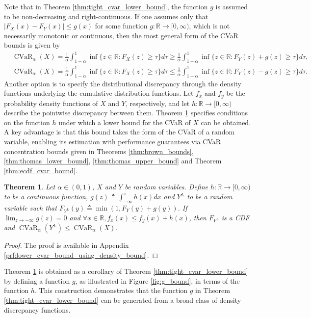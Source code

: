 \documentclass[acmlarge, manuscript, screen, review, natbib=false, oneside]{acmart}
\newtheorem{theorem}{Theorem}[section]
\DeclareMathOperator{\CVaR}{CVaR}
\begin{document}
Note that in Theorem \ref{thm:tight_cvar_lower_bound}, the function $g$ is assumed to be non-decreasing and right-continuous. If one assumes only that $|F_X(x) - F_Y(x)| \leq g(x)$ for some function $g : \mathbb{R} \to [0, \infty)$, which is not necessarily monotonic or continuous, then the most general form of the CVaR bounds is given by
\begin{equation}\label{eq:general_g_cvar_lower_bound}
	\begin{aligned}
		&\CVaR_\alpha(X)=\frac{1}{\alpha}\int_{1-\alpha}^1 \inf\{z\in \mathbb{R}:F_X(z)\geq \tau\}d\tau 
		\geq \frac{1}{\alpha}\int_{1-\alpha}^1 \inf\{z\in \mathbb{R}:F_Y(z)+g(z)\geq \tau\}d\tau,
	\end{aligned}
\end{equation}
\begin{equation}\label{eq:general_g_cvar_upper_bound}
	\begin{aligned}
		&\CVaR_\alpha(X)=\frac{1}{\alpha}\int_{1-\alpha}^1 \inf\{z\in \mathbb{R}:F_X(z)\geq \tau\}d\tau 
		\leq \frac{1}{\alpha}\int_{1-\alpha}^1 \inf\{z\in \mathbb{R}:F_Y(z)-g(z)\geq \tau\}d\tau.
	\end{aligned}
\end{equation}
%
Another option is to specify the distributional discrepancy through the density functions underlying the cumulative distribution functions. Let $f_x$ and $f_y$ be the probability density functions of $X$ and $Y$, respectively, and let $h : \mathbb{R} \to [0, \infty)$ describe the pointwise discrepancy between them. Theorem \ref{thm:lower_cvar_bound_using_density_bound} specifies conditions on the function $h$ under which a lower bound for the CVaR of $X$ can be obtained. A key advantage is that this bound takes the form of the CVaR of a random variable, enabling its estimation with performance guarantees via CVaR concentration bounds given in Theorems \ref{thm:brown_bounds}, \ref{thm:thomas_lower_bound}, \ref{thm:thomas_upper_bound} and Theorem \ref{thm:ecdf_cvar_bound}.

\begin{theorem}\label{thm:lower_cvar_bound_using_density_bound}
	Let $\alpha \in (0,1)$, $X$ and $Y$ be random variables. Define $h:\mathbb{R}\rightarrow [0,\infty)$ to be a continuous function, $g(z)\triangleq\int_{-\infty}^z h(x)dx$ and $Y^L$ to be a random variable such that $F_{Y^L}(y)\triangleq\min(1, F_{Y}(y) + g(y))$. If $\lim_{z\rightarrow -\infty} g(z)=0$ and $\forall x\in \mathbb{R},f_x(x)\leq f_y(x) + h(x)$, then $F_{Y^L}$ is a CDF and $\CVaR_\alpha(Y^L)\leq \CVaR_\alpha(X)$.
\end{theorem}
\begin{proof}
	The proof is available in Appendix \ref{prf:lower_cvar_bound_using_density_bound}.
\end{proof}
Theorem \ref{thm:lower_cvar_bound_using_density_bound} is obtained as a corollary of Theorem \ref{thm:tight_cvar_lower_bound} by defining a function $g$, as illustrated in Figure \ref{fig:g_bound}, in terms of the function $h$. This construction demonstrates that the function $g$ in Theorem \ref{thm:tight_cvar_lower_bound} can be generated from a broad class of density discrepancy functions.
\end{document}
